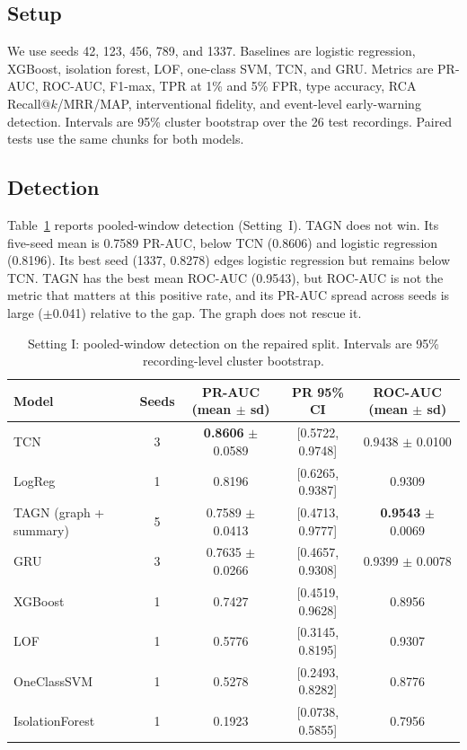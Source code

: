 \documentclass[conference]{IEEEtran}
\begin{document}
\subsection{Setup}

We use seeds 42, 123, 456, 789, and 1337. Baselines are logistic regression, XGBoost, isolation forest, LOF, one-class SVM, TCN, and GRU. Metrics are PR-AUC, ROC-AUC, F1-max, TPR at 1\% and 5\% FPR, type accuracy, RCA Recall@$k$/MRR/MAP, interventional fidelity, and event-level early-warning detection. Intervals are 95\% cluster bootstrap over the 26 test recordings. Paired tests use the same chunks for both models.

\subsection{Detection}

Table~\ref{tab:detection} reports pooled-window detection (Setting~I). TAGN does not win. Its five-seed mean is 0.7589 PR-AUC, below TCN (0.8606) and logistic regression (0.8196). Its best seed (1337, 0.8278) edges logistic regression but remains below TCN. TAGN has the best mean ROC-AUC (0.9543), but ROC-AUC is not the metric that matters at this positive rate, and its PR-AUC spread across seeds is large ($\pm$0.041) relative to the gap. The graph does not rescue it.

\begin{table}[t]
\centering
\caption{Setting I: pooled-window detection on the repaired split. Intervals are 95\% recording-level cluster bootstrap.}
\label{tab:detection}
\small
\begin{tabular}{lcccc}
\toprule
Model & Seeds & PR-AUC (mean $\pm$ sd) & PR 95\% CI & ROC-AUC (mean $\pm$ sd) \\
\midrule
TCN & 3 & \textbf{0.8606} $\pm$ 0.0589 & [0.5722, 0.9748] & 0.9438 $\pm$ 0.0100 \\
LogReg & 1 & 0.8196 & [0.6265, 0.9387] & 0.9309 \\
TAGN (graph + summary) & 5 & 0.7589 $\pm$ 0.0413 & [0.4713, 0.9777] & \textbf{0.9543} $\pm$ 0.0069 \\
GRU & 3 & 0.7635 $\pm$ 0.0266 & [0.4657, 0.9308] & 0.9399 $\pm$ 0.0078 \\
XGBoost & 1 & 0.7427 & [0.4519, 0.9628] & 0.8956 \\
LOF & 1 & 0.5776 & [0.3145, 0.8195] & 0.9307 \\
OneClassSVM & 1 & 0.5278 & [0.2493, 0.8282] & 0.8776 \\
IsolationForest & 1 & 0.1923 & [0.0738, 0.5855] & 0.7956 \\
\bottomrule
\end{tabular}
\end{table}
\end{document}
